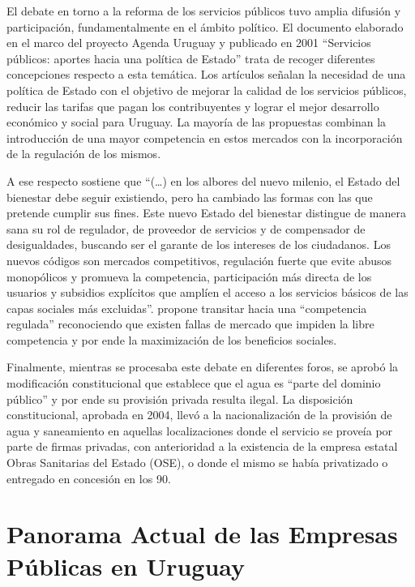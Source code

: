 \documentclass[
  12pt,
  spanish,
]{book}
\begin{document}
El debate en torno a la reforma de los servicios públicos tuvo amplia
difusión y participación, fundamentalmente en el ámbito político. El
documento elaborado en el marco del proyecto Agenda Uruguay y publicado
en 2001 ``Servicios públicos: aportes hacia una política de Estado''
\citep{CIIIPUPAZ2001} trata de recoger diferentes concepciones respecto
a esta temática. Los artículos señalan la necesidad de una política de
Estado con el objetivo de mejorar la calidad de los servicios públicos,
reducir las tarifas que pagan los contribuyentes y lograr el mejor
desarrollo económico y social para Uruguay. La mayoría de las propuestas
combinan la introducción de una mayor competencia en estos mercados con
la incorporación de la regulación de los mismos.

A ese respecto \citet{Bergara2001} sostiene que ``(\ldots) en los
albores del nuevo milenio, el Estado del bienestar debe seguir
existiendo, pero ha cambiado las formas con las que pretende cumplir sus
fines. Este nuevo Estado del bienestar distingue de manera sana su rol
de regulador, de proveedor de servicios y de compensador de
desigualdades, buscando ser el garante de los intereses de los
ciudadanos. Los nuevos códigos son mercados competitivos, regulación
fuerte que evite abusos monopólicos y promueva la competencia,
participación más directa de los usuarios y subsidios explícitos que
amplíen el acceso a los servicios básicos de las capas sociales más
excluidas''. \citet{Mederos2001} propone transitar hacia una
``competencia regulada'' reconociendo que existen fallas de mercado que
impiden la libre competencia y por ende la maximización de los
beneficios sociales.

Finalmente, mientras se procesaba este debate en diferentes foros, se
aprobó la modificación constitucional que establece que el agua es
``parte del dominio público'' y por ende su provisión privada resulta
ilegal. La disposición constitucional, aprobada en 2004, llevó a la
nacionalización de la provisión de agua y saneamiento en aquellas
localizaciones donde el servicio se proveía por parte de firmas
privadas, con anterioridad a la existencia de la empresa estatal Obras
Sanitarias del Estado (OSE), o donde el mismo se había privatizado o
entregado en concesión en los 90.

\hypertarget{panorama-actual-de-las-empresas-puxfablicas-en-uruguay}{%
\section{Panorama Actual de las Empresas Públicas en
Uruguay}\label{panorama-actual-de-las-empresas-puxfablicas-en-uruguay}}
\end{document}
